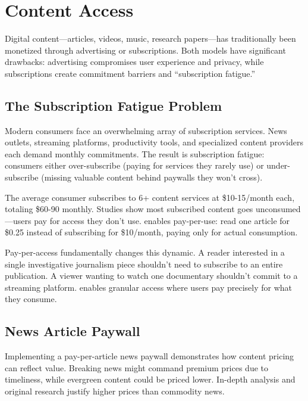 \section{Content Access}
\label{sec:content-access}

Digital content---articles, videos, music, research papers---has traditionally been monetized through advertising or subscriptions. Both models have significant drawbacks: advertising compromises user experience and privacy, while subscriptions create commitment barriers and ``subscription fatigue.''

\subsection{The Subscription Fatigue Problem}

Modern consumers face an overwhelming array of subscription services. News outlets, streaming platforms, productivity tools, and specialized content providers each demand monthly commitments. The result is subscription fatigue: consumers either over-subscribe (paying for services they rarely use) or under-subscribe (missing valuable content behind paywalls they won't cross).

\begin{infobox}
The average consumer subscribes to 6+ content services at \$10-15/month each, totaling \$60-90 monthly. Studies show most subscribed content goes unconsumed---users pay for access they don't use. \tprotocol{} enables pay-per-use: read one article for \$0.25 instead of subscribing for \$10/month, paying only for actual consumption.
\end{infobox}

Pay-per-access fundamentally changes this dynamic. A reader interested in a single investigative journalism piece shouldn't need to subscribe to an entire publication. A viewer wanting to watch one documentary shouldn't commit to a streaming platform. \tprotocol{} enables granular access where users pay precisely for what they consume.

\subsection{News Article Paywall}

Implementing a pay-per-article news paywall demonstrates how content pricing can reflect value. Breaking news might command premium prices due to timeliness, while evergreen content could be priced lower. In-depth analysis and original research justify higher prices than commodity news.

